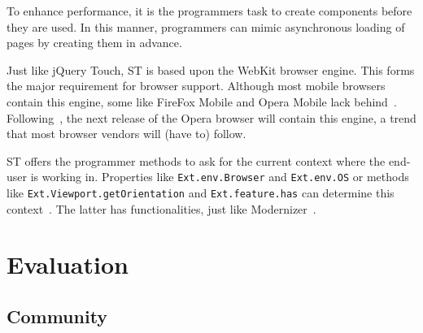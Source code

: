 \documentclass[a4paper]{artikel3}
\newcommand{\code}[1]{\texttt{#1}}
\renewcommand{\paragraph}[1]{\vspace{2mm} \noindent {\bf #1}  }
\begin{document}
To enhance performance,  it is the programmers task to create components before they are used.  In this manner,  programmers can mimic asynchronous loading of pages by creating them in advance.



\paragraph{Browser support}
Just like jQuery Touch,  ST is based upon the WebKit browser engine.  This forms the major requirement for browser support.  Although most mobile browsers contain this engine,  some like FireFox Mobile and Opera Mobile lack behind~\cite{JohnEClark2012}.  Following~\cite{Wokke2013}, the next release of the Opera browser will contain this engine,  a trend that most browser vendors will (have to) follow.

ST offers the programmer methods to ask for the current context where the end-user is working in.  Properties like \code{Ext.env.Browser} and \code{Ext.env.OS} or methods like \code{Ext.Viewport.getOrientation} and \code{Ext.feature.has} can determine this context~\cite{JohnEClark2012}.  The latter has functionalities,  just like Modernizer~\cite{Modernizr2012}.  


\section{Evaluation}

\subsection{Community} %
\label{sec:community}


\end{document}
